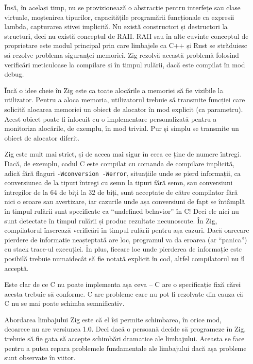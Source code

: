 \documentclass[a4paper,12pt]{report}
\begin{document}
Însă, în același timp, nu se provizionează o abstracție pentru interfețe sau clase virtuale,
moștenirea tipurilor, capacitățile programării funcționale ca expresii lambda,
capturarea stivei implicită.
Nu există constructori și destructori la structuri, deci nu există conceptul de \ac{RAII}.
\ac{RAII} sau în alte cuvinte conceptul de proprietare este modul principal
prin care limbajele ca C++ și Rust se străduiesc să rezolve problema siguranței memoriei.
Zig rezolvă această problemă folosind verificări meticuloase la compilare și în timpul rulării,
dacă este compilat în mod debug.

Încă o idee cheie în Zig este ca toate alocările a memoriei să fie vizibile la utilizator.
Pentru a aloca memoria, utilizatorul trebuie să transmite funcției care solicită alocarea memoriei
un obiect de alocator în mod explicit (ca parametru).
Acest obiect poate fi înlocuit cu o implementare personalizată
pentru a monitoriza alocările, de exemplu, în mod trivial.
Pur și simplu se transmite un obiect de alocator diferit.

Zig este mult mai strict, și de aceea mai sigur în ceea ce ține de numere întregi.
Dacă, de exemplu, codul C este compilat cu comanda de compilare implicită,
adică fără flaguri \texttt{-Wconversion -Werror}, situațiile unde se pierd informații,
ca conversiunea de la tipuri întregi cu semn la tipuri fără semn, sau conversiuni întregilor
de la 64 de biți la 32 de biți, sunt acceptate de către compilator fără nici o eroare sau avertizare,
iar cazurile unde așa conversiuni de fapt se întâmplă în timpul rulării
sunt specificate ca ``undefined behavior'' în C!
Deci ele nici nu sunt detectate în timpul rulării și produc rezultate necunoscute.
În Zig, compilatorul înserează verificări în timpul rulării pentru așa cazuri.
Dacă oarecare pierdere de informație neașteptată are loc,
programul va da eroarea (ar ``panica'') cu stack trace-ul execuției.
În plus, fiecare loc unde pierderea de informație este posibilă trebuie numaidecât
să fie notată explicit în cod, altfel compilatorul nu îl acceptă.

Este clar de ce C nu poate implementa așa ceva --
C are o specificație fixă cărei acesta trebuie să conforme.
C are probleme care nu pot fi rezolvate din cauza că C nu se mai poate schimba semnificativ.

Abordarea limbajului Zig este că el își permite schimbarea,
în orice mod, deoarece nu are versiunea 1.0.
Deci dacă o persoană decide să programeze în Zig,
trebuie să fie gata să accepte schimbări dramatice ale limbajului.
Aceasta se face pentru a putea repara problemele fundamentale
ale limbajului dacă așa probleme sunt observate în viitor.
\end{document}
